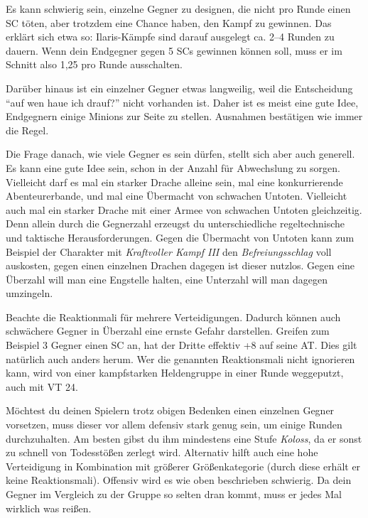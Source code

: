 Es kann schwierig sein, einzelne Gegner zu designen, die nicht pro Runde einen SC töten, aber trotzdem eine Chance haben, den Kampf zu gewinnen. Das erklärt sich etwa so: Ilaris-Kämpfe sind darauf ausgelegt ca. 2--4 Runden zu dauern. Wenn dein Endgegner gegen 5 SCs gewinnen können soll, muss er im Schnitt also 1,25 pro Runde ausschalten.

 Darüber hinaus ist ein einzelner Gegner etwas langweilig, weil die Entscheidung \enquote{auf wen haue ich drauf?} nicht vorhanden ist.
 Daher ist es meist eine gute Idee, Endgegnern einige Minions zur Seite zu stellen.
 Ausnahmen bestätigen wie immer die Regel. 

Die Frage danach, wie viele Gegner es sein dürfen, stellt sich aber auch generell.
Es kann eine gute Idee sein, schon in der Anzahl für Abwechslung zu sorgen.
Vielleicht darf es mal ein starker Drache alleine sein, mal eine konkurrierende Abenteurerbande, und mal eine Übermacht von schwachen Untoten.
Vielleicht auch mal ein starker Drache mit einer Armee von schwachen Untoten gleichzeitig.
Denn allein durch die Gegnerzahl erzeugst du unterschiedliche regeltechnische und taktische Herausforderungen.
Gegen die Übermacht von Untoten kann zum Beispiel der Charakter mit \textit{Kraftvoller Kampf III} den \textit{Befreiungsschlag} voll auskosten, gegen einen einzelnen Drachen dagegen ist dieser nutzlos.
Gegen eine Überzahl will man eine Engstelle halten, eine Unterzahl will man dagegen umzingeln.


Beachte die Reaktionmali für mehrere Verteidigungen. Dadurch können auch schwächere Gegner in Überzahl eine ernste Gefahr darstellen. Greifen zum Beispiel 3 Gegner einen SC an, hat der Dritte effektiv +8 auf seine AT.
Dies gilt natürlich auch anders herum.
Wer die genannten Reaktionsmali nicht ignorieren kann, wird von einer kampfstarken Heldengruppe in einer Runde weggeputzt, auch mit VT 24.

Möchtest du deinen Spielern trotz obigen Bedenken einen einzelnen Gegner vorsetzen, muss dieser vor allem defensiv stark genug sein, um einige Runden durchzuhalten. Am besten gibst du ihm mindestens eine Stufe \textit{Koloss}, da er sonst zu schnell von Todesstößen zerlegt wird.
Alternativ hilft auch eine hohe Verteidigung in Kombination mit größerer Größenkategorie (durch diese erhält er keine Reaktionsmali).
Offensiv wird es wie oben beschrieben schwierig.
Da dein Gegner im Vergleich zu der Gruppe so selten dran kommt, muss er jedes Mal wirklich was reißen. %


